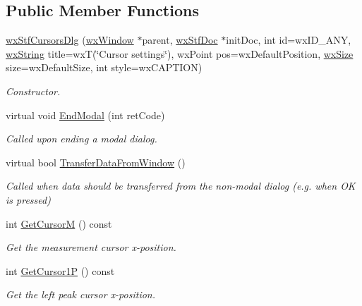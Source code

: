 \subsection*{Public Member Functions}
\begin{DoxyCompactItemize}
\item 
\hyperlink{classwxStfCursorsDlg_a94b84498bba9d335ecab89e0f5030e41}{wxStfCursorsDlg} (\hyperlink{classwxWindow}{wxWindow} $\ast$parent, \hyperlink{classwxStfDoc}{wxStfDoc} $\ast$initDoc, int id=wxID\_\-ANY, \hyperlink{classwxString}{wxString} title=wxT(\char`\"{}Cursor settings\char`\"{}), wxPoint pos=wxDefaultPosition, \hyperlink{classwxSize}{wxSize} size=wxDefaultSize, int style=wxCAPTION)
\begin{DoxyCompactList}\small\item\em Constructor. \item\end{DoxyCompactList}\item 
virtual void \hyperlink{classwxStfCursorsDlg_afa2eeb514962a88b822018daa4cf84b4}{EndModal} (int retCode)
\begin{DoxyCompactList}\small\item\em Called upon ending a modal dialog. \item\end{DoxyCompactList}\item 
virtual bool \hyperlink{classwxStfCursorsDlg_a681f5abeb01d02fe312a2a164769d98c}{TransferDataFromWindow} ()
\begin{DoxyCompactList}\small\item\em Called when data should be transferred from the non-\/modal dialog (e.g. when OK is pressed) \item\end{DoxyCompactList}\item 
int \hyperlink{classwxStfCursorsDlg_a3c33644d6e71ff2f94c3e2a95889d5a0}{GetCursorM} () const 
\begin{DoxyCompactList}\small\item\em Get the measurement cursor x-\/position. \item\end{DoxyCompactList}\item 
int \hyperlink{classwxStfCursorsDlg_a588a9bc27f41358b26daa1ea7bb9ae53}{GetCursor1P} () const 
\begin{DoxyCompactList}\small\item\em Get the left peak cursor x-\/position. \item\end{DoxyCompactList}\item 

\end{DoxyCompactItemize}
